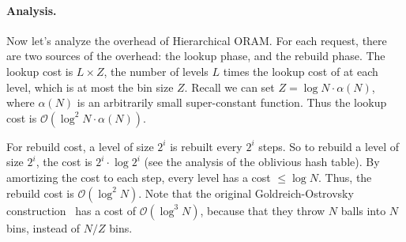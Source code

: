 \paragraph{Analysis.} Now let's analyze the overhead of Hierarchical ORAM. 
For each request, 
there are two sources of the overhead: the lookup phase, and the rebuild phase.
The lookup cost is $L \times Z$, the number of levels $L$ times the lookup cost of at each level, which is at most the bin size $Z$.
 Recall we can set $Z = \log N \cdot \alpha(N)$, where $\alpha(N)$ is 
an arbitrarily small super-constant function. 
Thus the lookup cost is $\mathcal{O}(\log^2 N \cdot \alpha(N))$.

For rebuild cost, a level of size $2^i$ is rebuilt every $2^i$ steps.
So to rebuild a level of size $2^i$, the cost is $2^i \cdot \log 2^i$ (see the analysis of the oblivious hash table).
By amortizing the cost to each step, every level has a cost $\leq \log N$.
Thus, the rebuild cost is $\mathcal{O}(\log^2 N)$.
Note that the original Goldreich-Ostrovsky construction~\cite{10.1145/233551.233553} has a cost of $\mathcal{O}(\log^3 N)$, because that they throw $N$ balls into $N$ bins, instead of $N/Z$ bins.
